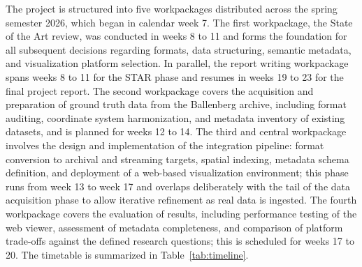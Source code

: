 \documentclass[]{report}
\begin{document}
The project is structured into five workpackages distributed across the spring semester 2026,
which began in calendar week 7. The first workpackage, the State of the Art review, was
conducted in weeks 8 to 11 and forms the foundation for all subsequent decisions regarding
formats, data structuring, semantic metadata, and visualization platform selection. In parallel,
the report writing workpackage spans weeks 8 to 11 for the STAR phase and resumes in weeks 19
to 23 for the final project report. The second workpackage covers the acquisition and preparation
of ground truth data from the Ballenberg archive, including format auditing, coordinate system
harmonization, and metadata inventory of existing datasets, and is planned for weeks 12 to 14.
The third and central workpackage involves the design and implementation of the integration
pipeline: format conversion to archival and streaming targets, spatial indexing, metadata
schema definition, and deployment of a web-based visualization environment; this phase runs
from week 13 to week 17 and overlaps deliberately with the tail of the data acquisition phase
to allow iterative refinement as real data is ingested. The fourth workpackage covers the
evaluation of results, including performance testing of the web viewer, assessment of metadata
completeness, and comparison of platform trade-offs against the defined research questions;
this is scheduled for weeks 17 to 20. The timetable is summarized in Table~\ref{tab:timeline}.
\end{document}
